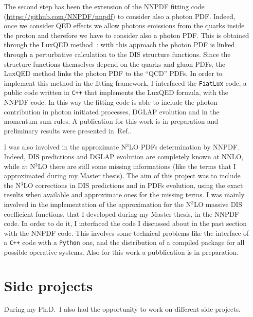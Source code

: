 \documentclass[11pt,a4paper]{moderncv}        %
\begin{document}
The second step has been the extension of the NNPDF fitting code (\url{https://github.com/NNPDF/nnpdf}) to consider also
a photon PDF.
Indeed, once we consider QED effects we allow photons emissions from the quarks inside the proton and therefore we have to consider also a photon PDF.
This is obtained through the LuxQED method~\cite{Manohar:2016nzj, Manohar:2017eqh}: with this approach the photon PDF is linked through
a perturbative calculation to the DIS structure functions.
Since the structure functions themselves depend on the quarks and gluon PDFs, the LuxQED method links the photon PDF to the ``QCD'' PDFs.
In order to implement this method in the fitting framework, I interfaced the \texttt{FiatLux} code, a public code written in \texttt{C++} that implements the LuxQED formula, with the NNPDF code.
In this way the fitting code is able to include the photon contribution in photon initiated processes, DGLAP evolution and in the momentum sum rules.
A publication for this work is in preparation and preliminary results were presented in~Ref.\cite{LAURENTI2023}.

I was also involved in the approximate N$^3$LO PDFs determination by NNPDF.
Indeed, DIS predictions and DGLAP evolution are completely known at NNLO, while at N$^3$LO there are still some missing informations
(like the terms that I approximated during my Master thesis).
The aim of this project was to include the N$^3$LO corrections in DIS predictions and in PDFs evolution,
using the exact results when available and approximate ones for the missing terms.
I was mainly involved in the implementation of the approximation for the N$^3$LO massive DIS coefficient functions, that I developed
during my Master thesis, in the NNPDF code.
In order to do it, I interfaced the code I discussed about in the past section with the NNPDF code.
This involves some technical problems like the interface of a \texttt{C++} code with a \texttt{Python} one, and the distribution of
a compiled package for all possible operative systems. %
Also for this work a pubblication is in preparation.


\section{Side projects}

During my Ph.D.\ I also had the opportunity to work on different side projects.
\end{document}
